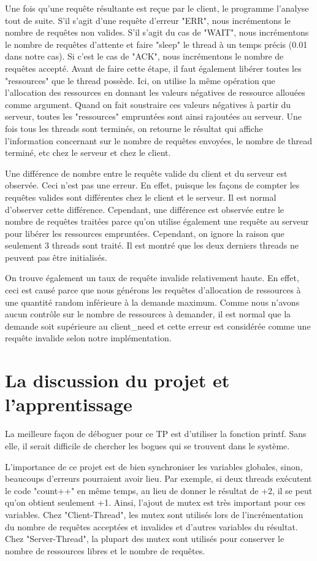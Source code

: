 \documentclass[11pt]{article}
\begin{document}
Une fois qu'une requête résultante est reçue par le client, le programme l'analyse tout de suite. S'il s'agit d'une requête d'erreur "ERR", nous incrémentons le nombre de requêtes non valides. S'il s'agit du cas de "WAIT", nous incrémentons le nombre de requêtes d'attente et faire "sleep" le thread à un temps précis (0.01 dans notre cas). Si c'est le cas de "ACK", nous incrémentons le nombre de requêtes accepté. Avant de faire cette étape, il faut également libérer toutes les "ressources" que le thread possède. Ici, on utilise la même opération que l'allocation des ressources en donnant les valeurs négatives de ressource allouées comme argument. Quand on fait soustraire ces valeurs négatives à partir du serveur, toutes les "ressources" empruntées sont ainsi rajoutées au serveur. Une fois tous les threads sont terminés, on retourne le résultat qui affiche l'information concernant sur le nombre de requêtes envoyées, le nombre de thread terminé, etc chez le serveur et chez le client.

Une différence de nombre entre le requête valide du client et du serveur est observée. Ceci n'est pas une erreur. En effet, puisque les façons de compter les requêtes valides sont différentes chez le client et le serveur. Il est normal d'observer cette différence. Cependant, une différence est observée entre le nombre de requêtes traitées parce qu'on utilise également une requête au serveur pour libérer les ressources empruntées. Cependant, on ignore la raison que seulement 3 threads sont traité. Il est montré que les deux derniers threads ne peuvent pas être initialisés.

On trouve également un taux de requête invalide relativement haute. En effet, ceci est causé parce que nous générons les requêtes d'allocation de ressources à une quantité random inférieure à la demande maximum. Comme nous n'avons aucun contrôle sur le nombre de ressources à demander, il est normal que la demande soit supérieure au client\_need et cette erreur est considérée comme une requête invalide selon notre implémentation.

\section{La discussion du projet et l'apprentissage}


La meilleure façon de déboguer pour ce TP est d'utiliser la fonction printf. Sans elle, il serait difficile de chercher les bogues qui se trouvent dans le système.

L'importance de ce projet est de bien synchroniser les variables globales, sinon, beaucoups d'erreurs pourraient avoir lieu. Par exemple, si deux threads exécutent le code "count++" en même temps, au lieu de donner le résultat de +2, il se peut qu'on obtient seulement +1. Ainsi, l'ajout de mutex est très important pour ces variables. Chez "Client-Thread", les mutex sont utilisés lors de l'incrémentation du nombre de requêtes acceptées et invalides et d'autres variables du résultat. Chez "Server-Thread", la plupart des mutex sont utilisés pour conserver le nombre de ressources libres et le nombre de requêtes. 
\end{document}
